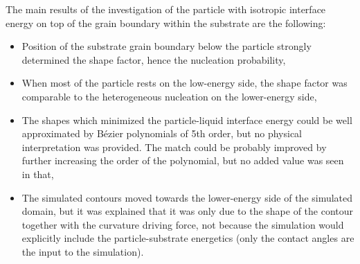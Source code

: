 The main results of the investigation of the particle with isotropic interface energy on top of the grain boundary within the substrate are the following:
\begin{itemize}
	\item Position of the substrate grain boundary below the particle strongly determined the shape factor, hence the nucleation probability,
	\item When most of the particle rests on the low-energy side, the shape factor was comparable to the heterogeneous nucleation on the lower-energy side,
	\item The shapes which minimized the particle-liquid interface energy could be well approximated by Bézier polynomials of 5th order, but no physical interpretation was provided. The match could be probably improved by further increasing the order of the polynomial, but no added value was seen in that,
	\item The simulated contours moved towards the lower-energy side of the simulated domain, but it was explained that it was only due to the shape of the contour together with the curvature driving force, not because the simulation would explicitly include the particle-substrate energetics (only the contact angles are the input to the simulation).
\end{itemize}

\cleardoublepage

